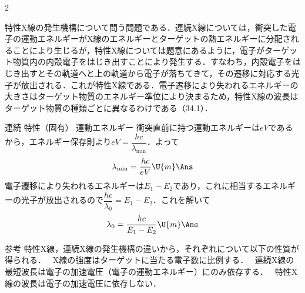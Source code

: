 \begin{multicols}{2}
\par\nopagebreak
\begin{sisin}
特性X線の発生機構について問う問題である．連続X線については，衝突した電子の運動エネルギーがX線のエネルギーとターゲットの熱エネルギーに分配されることにより生じるが，特性X線については題意にあるように，電子がターゲット物質内の内殻電子をはじき出すことにより発生する．すなわち，内殻電子をはじき出すとその軌道へと上の軌道から電子が落ちてきて，その遷移に対応する光子が放出される．これが特性X線である．電子遷移により失われるエネルギーの大きさはターゲット物質のエネルギー準位により決まるため，特性X線の波長はターゲット物質の種類ごとに異なるわけである（34.1）．
\end{sisin}
\KaiHead
\begin{komon}
 連続\Ans
{} 特性（固有）\Ans
{} 運動エネルギー\Ans
{} 衝突直前に持つ運動エネルギーは$eV$であるから，エネルギー保存則より$eV=\dfrac{hc}{\lambda_{\min}}$．よって
       \[\lambda_{\min}=\frac{hc}{eV}\U{m}\Ans\]
 電子遷移により失われるエネルギーは$E_1-E_2$であり，これに相当するエネルギーの光子が放出されるので$\dfrac{hc}{\lambda_0}=E_1-E_2$．これを解いて
       \[\lambda_0=\frac{hc}{E_1-E_2}\U{m}\Ans\]
\end{komon}
\begin{bsHosoku}{参考}
特性X線，連続X線の発生機構の違いから，それぞれについて以下の性質が得られる．
\ X線の強度はターゲットに当たる電子数に比例する．
\ 連続X線の最短波長は電子の加速電圧（電子の運動エネルギー）にのみ依存する．
\ 特性X線の波長は電子の加速電圧に依存しない．
\end{bsHosoku}


\end{multicols}
